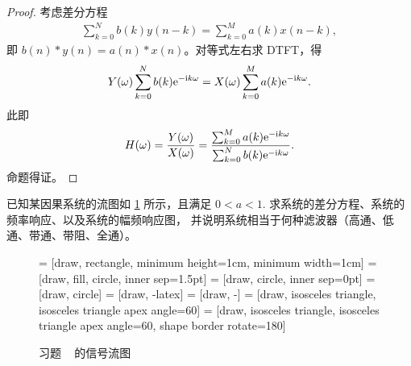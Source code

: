 \begin{proof}
    考虑差分方程
    \begin{align*}
        \sum_{k = 0}^{N}b(k)y(n - k) = \sum_{k = 0}^{M}a(k)x(n - k),
    \end{align*}
    即 $b(n) * y(n) = a(n) * x(n)$。对等式左右求 DTFT，得
    \begin{align*}
        Y(\omega) \sum_{k = 0}^{N}b(k)\mathrm{e}^{-\mathrm{i} k\omega} = X(\omega)\sum_{k = 0}^{M}a(k)\mathrm{e}^{-\mathrm{i} k\omega}.
    \end{align*}
    此即
    \begin{align*}
        H(\omega) = \frac{Y(\omega)}{X(\omega)} = \frac{\sum_{k = 0}^{M}a(k)\mathrm{e}^{-\mathrm{i} k \omega}}{\sum_{k = 0}^{N}b(k)\mathrm{e}^{-\mathrm{i} k \omega}}.
    \end{align*}
    命题得证。
\end{proof}

\begin{exercise}
    已知某因果系统的流图如 \ref{fig:chap4-part1-quiz2} 所示，且满足 $0 < a < 1$.
    求系统的差分方程、系统的频率响应、以及系统的幅频响应图，
    并说明系统相当于何种滤波器（高通、低通、带通、带阻、全通）。
    \begin{figure}[H]
        \centering
         = [draw, rectangle, minimum height=1cm, minimum width=1cm]
         = [draw, fill, circle, inner sep=1.5pt]
         = [draw, circle, inner sep=0pt]
         = [draw, circle]
         = [draw, -latex]
         = [draw, -]
         = [draw, isosceles triangle, isosceles triangle apex angle=60]
         = [draw, isosceles triangle, isosceles triangle apex angle=60, shape border rotate=180]
        \caption{习题 \theexercise~ 的信号流图}
        \label{fig:chap4-part1-quiz2}
    \end{figure}
\end{exercise}

